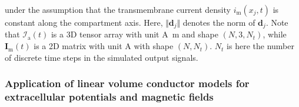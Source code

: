 under the assumption that the transmembrane current density $i_\mathrm{m}(x_j, t)$ is constant along the compartment axis.
Here, $\Vert\mathbf{d}_j \Vert$ denotes the norm of $\mathbf{d}_j$.
Note that $\mathcal{I}_\mathrm{a}(t)$ is a 3D tensor array with unit \si{\ampere \metre} and shape $(N, 3, N_t)$,
while $\mathbf{I}_\mathrm{m}(t)$ is a 2D matrix with unit \si{A} with shape $(N, N_t)$.
$N_t$ is here the number of discrete time steps in the simulated output signals.



\subsubsection{Application of linear volume conductor models for extracellular potentials and magnetic fields}

